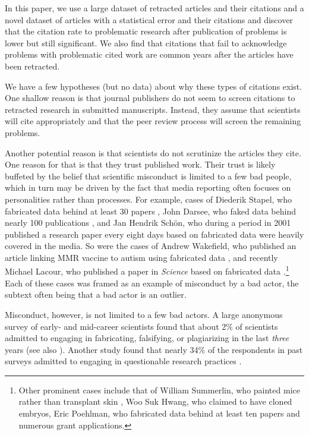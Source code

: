 \documentclass[12pt, letterpaper]{article}
\begin{document}
In this paper, we use a large dataset of retracted articles and their citations and a novel dataset of articles with a statistical error and their citations and discover that the citation rate to problematic research after publication of problems is lower but still significant. We also find that citations that fail to acknowledge problems with problematic cited work are common years after the articles have been retracted.

We have a few hypotheses (but no data) about why these types of citations exist. One shallow reason is that journal publishers do not seem to screen citations to retracted research in submitted manuscripts. Instead, they assume that scientists will cite appropriately and that the peer review process will screen the remaining problems. 

Another potential reason is that scientists do not scrutinize the articles they cite. One reason for that is that they trust published work. Their trust is likely buffeted by the belief that scientific misconduct is limited to a few bad people, which in turn may be driven by the fact that media reporting often focuses on personalities rather than processes. For example, cases of Diederik Stapel, who fabricated data behind at least 30 papers \citep{levelt2012flawed}, John Darsee, who faked data behind nearly 100 publications \citep{stewart1987integrity, anderson2013research, wallis1983fraud}, and Jan Hendrik Sch{\"o}n, who during a period in 2001 published a research paper every eight days based on fabricated data \citep{service2003scientific, anderson2013research} were heavily covered in the media. So were the cases of Andrew Wakefield, who published an article linking MMR vaccine to autism using fabricated data \citep{wakefield1998retracted, deer2011case, godlee2011wakefield}, and recently Michael Lacour, who published a paper in \textit{Science} based on fabricated data \citep{broockman2015irregularities, mcnutt2015editorial}.\footnote{Other prominent cases include that of William Summerlin, who painted mice rather than transplant skin \citep{basu2006they, anderson2013research}, Woo Suk Hwang, who claimed to have cloned embryos, Eric Poehlman, who fabricated data behind at least ten papers and numerous grant applications.} Each of these cases was framed as an example of misconduct by a bad actor, the subtext often being that a bad actor is an outlier.

Misconduct, however, is not limited to a few bad actors.  A large anonymous survey of early- and mid-career scientists found that about 2\% of scientists admitted to engaging in fabricating, falsifying, or plagiarizing in the last \textit{three} years \citet{martinson2005scientists} (see also \citet{titus2008repairing}). Another study found that nearly 34\% of the respondents in past surveys admitted to engaging in questionable research practices \citet{fanelli2009many}.
\end{document}
